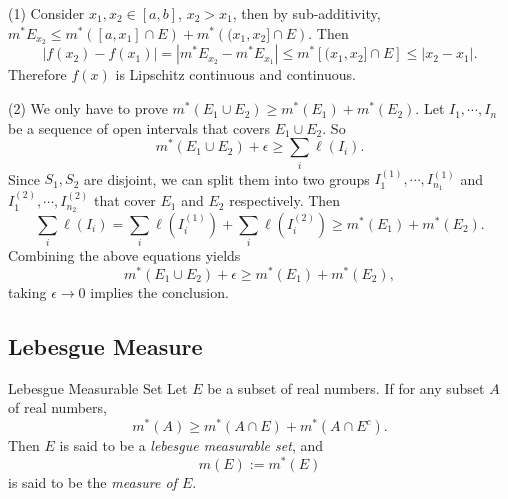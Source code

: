 \begin{solution}
  (1) Consider $x_1, x_2 \in [a, b]$, $x_2 > x_1$, then by sub-additivity,
  $m^{\ast}E_{x_2} \leq m^{\ast}\left( [a, x_1] \cap E \right) + m^{\ast} \left( (x_1, x_2] \cap E \right)$.
  Then
  \begin{equation}
    |f(x_2) - f(x_1)| = |m^{\ast}E_{x_2} - m^{\ast}E_{x_1}|
    \leq m^{\ast} \left[ (x_1, x_2] \cap E \right] \leq |x_2-x_1|.
  \end{equation}
  Therefore $f(x)$ is Lipschitz continuous and continuous.

  (2) We only have to prove $m^{\ast}(E_1 \cup E_2) \geq m^{\ast}(E_1) + m^{\ast}(E_2)$.
  Let $I_1,\cdots,I_n$ be a sequence of open intervals that covers $E_1 \cup E_2$.
  So
  \begin{equation}
    m^{\ast}(E_1 \cup E_2) + \epsilon \geq \sum_i \ell(I_i).
  \end{equation}
  Since $S_1, S_2$ are disjoint,
  we can split them into two groups $I_1^{(1)},\cdots,I_{n_1}^{(1)}$ and $I_1^{(2)},\cdots,I_{n_2}^{(2)}$
  that cover $E_1$ and $E_2$ respectively. Then
  \begin{equation}
    \sum_i \ell(I_i) = \sum_i \ell(I_i^{(1)}) + \sum_i \ell(I_i^{(2)})
    \geq m^{\ast}(E_1) + m^{\ast}(E_2).
  \end{equation}
  Combining the above equations yields
  \begin{equation}
    m^{\ast}(E_1 \cup E_2) + \epsilon \geq m^{\ast}(E_1) + m^{\ast}(E_2),
  \end{equation}
  taking $\epsilon \rightarrow 0$ implies the conclusion.
\end{solution}

\subsection{Lebesgue Measure}

\begin{definition}{Lebesgue Measurable Set}{}
  Let $E$ be a subset of real numbers.
  If for any subset $A$ of real numbers,
  \begin{equation}
    m^{\ast}(A) \geq m^{\ast}(A \cap E) + m^{\ast}(A \cap E^c).
  \end{equation}
  Then $E$ is said to be a \emph{lebesgue measurable set},
  and
  \begin{equation}
    m(E) := m^{\ast}(E)
  \end{equation}
  is said to be the \emph{measure of $E$}.
\end{definition}

